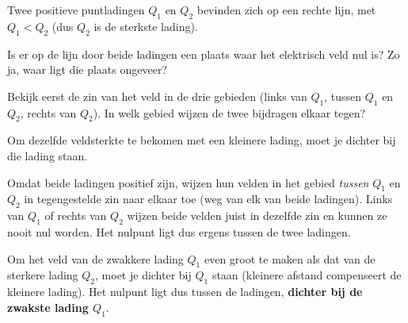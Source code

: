 \documentclass{ximera}
\begin{document}
\begin{question}
    Twee positieve puntladingen $Q_{1}$ en $Q_{2}$ bevinden zich op een rechte lijn, met $Q_{1} < Q_{2}$ (dus $Q_2$ is de sterkste lading).

    \begin{center}
    \end{center}

    Is er op de lijn door beide ladingen een plaats waar het elektrisch veld nul is? Zo ja, waar ligt die plaats ongeveer?

    \begin{multipleChoice}
    \end{multipleChoice}

    \begin{hint}
        Bekijk eerst de zin van het veld in de drie gebieden (links van $Q_1$, tussen $Q_1$ en $Q_2$, rechts van $Q_2$). In welk gebied wijzen de twee bijdragen elkaar tegen?
    \end{hint}
    \begin{hint}
        Om dezelfde veldsterkte te bekomen met een kleinere lading, moet je dichter bij die lading staan.
    \end{hint}

    \begin{solution}\nl
        Omdat beide ladingen positief zijn, wijzen hun velden in het gebied \emph{tussen} $Q_1$ en $Q_2$ in tegengestelde zin naar elkaar toe (weg van elk van beide ladingen). Links van $Q_1$ of rechts van $Q_2$ wijzen beide velden juist in dezelfde zin en kunnen ze nooit nul worden. Het nulpunt ligt dus ergens tussen de twee ladingen.

        Om het veld van de zwakkere lading $Q_1$ even groot te maken als dat van de sterkere lading $Q_2$, moet je dichter bij $Q_1$ staan (kleinere afstand compenseert de kleinere lading). Het nulpunt ligt dus tussen de ladingen, \textbf{dichter bij de zwakste lading $Q_1$}.
    \end{solution}
\end{question}
\end{document}

